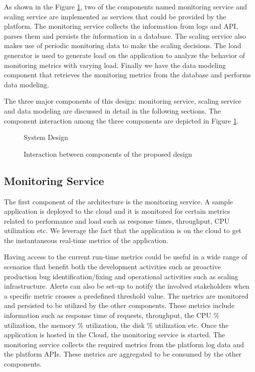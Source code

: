 \documentclass[article,type=msc,colorback,12pt,accentcolor=tud8b,table]{tudthesis}
\begin{document}
	As shown in the Figure \ref{fig:system_design}, two of the components named monitoring service and scaling service are implemented as services that could be provided by the platform. The monitoring service collects the information from logs and API, parses them and persists the information in a database. The scaling service also makes use of periodic monitoring data to make the scaling decisions. The load generator is used to generate load on the application to analyze the behavior of monitoring metrics with varying load. Finally we have the data modeling component that retrieves the monitoring metrics from the database and performs data modeling.
	
	The three major components of this design: monitoring service, scaling service and data modeling are discussed in detail in the following sections. The component interaction among the three components are depicted in Figure \ref{fig:system_design}.
 	
 			 \begin{figure}
 			 	\begin{center}
 			 	\end{center}
 			 	\caption{System Design}
 			 	\label{fig:system_design}
 			 \end{figure}
 

 			 \begin{figure}
 			 	\begin{center}
 			 	\end{center}
 			 	\caption{Interaction between components of the proposed design}
 			 	\label{fig:system_component_interaction}
 			 \end{figure}

	\subsection{Monitoring Service} 
 	The first component of the architecture is the monitoring service. A sample application is deployed to the cloud and it is monitored for certain metrics related to performance and load such as response times, throughput, CPU utilization etc. We leverage the fact that the application is on the cloud to get the instantaneous real-time metrics of the application. 
 	\par Having access to the current run-time metrics could be useful in a wide range of scenarios that benefit both the development activities such as proactive production bug identification/fixing and operational activities such as scaling infrastructure. Alerts can also be set-up to notify the involved stakeholders when a specific metric crosses a predefined threshold value. The metrics are monitored and persisted to be utilized by the other components. These metrics include information such as response time of requests, throughput, the CPU \% utilization, the memory \% utilization, the disk \% utilization etc. Once the application is hosted in the Cloud, the monitoring service is started. 	The monitoring service collects the required metrics from the platform log data and the platform APIs. These metrics are aggregated to be consumed by the other components. 
 	
\end{document}
